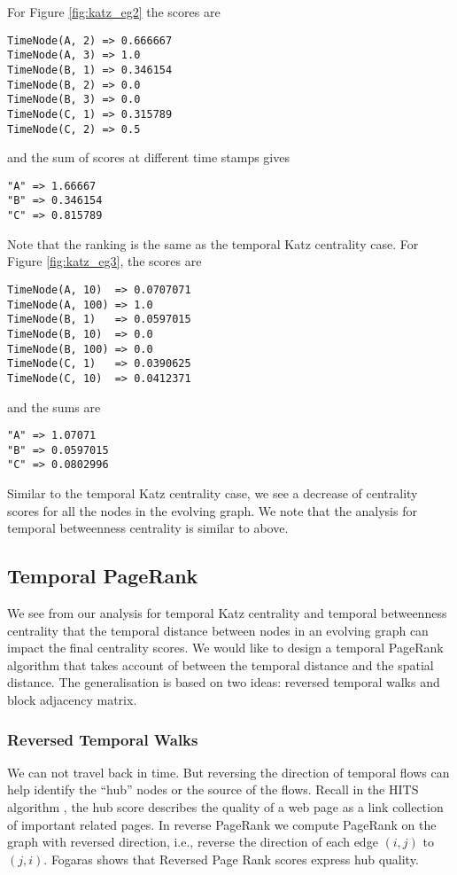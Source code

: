\documentclass[12pt]{article}
\theoremstyle{definition}
\begin{document}
For Figure \ref{fig:katz_eg2} the scores are
\begin{lstlisting}
TimeNode(A, 2) => 0.666667
TimeNode(A, 3) => 1.0
TimeNode(B, 1) => 0.346154
TimeNode(B, 2) => 0.0
TimeNode(B, 3) => 0.0
TimeNode(C, 1) => 0.315789
TimeNode(C, 2) => 0.5
\end{lstlisting}
and the sum of scores at different time stamps gives
\begin{lstlisting}
"A" => 1.66667
"B" => 0.346154
"C" => 0.815789
\end{lstlisting}
Note that the ranking is the same as the temporal Katz centrality case.
For Figure \ref{fig:katz_eg3}, the scores are
\begin{lstlisting}
TimeNode(A, 10)  => 0.0707071
TimeNode(A, 100) => 1.0
TimeNode(B, 1)   => 0.0597015
TimeNode(B, 10)  => 0.0
TimeNode(B, 100) => 0.0
TimeNode(C, 1)   => 0.0390625
TimeNode(C, 10)  => 0.0412371
\end{lstlisting}
and the sums are
\begin{lstlisting}
"A" => 1.07071
"B" => 0.0597015
"C" => 0.0802996
\end{lstlisting}
Similar to the temporal Katz centrality case, we see a decrease of centrality scores
for all the nodes in the evolving graph.
We note that the analysis for temporal betweenness centrality is similar to above.

\subsection{Temporal PageRank}

We see from our analysis for temporal Katz centrality and temporal betweenness centrality
that the temporal distance between nodes in an evolving graph can impact the final centrality scores.
We would like to design a temporal PageRank algorithm that takes account of between
the temporal distance and the spatial distance. The generalisation is based on two ideas:
reversed temporal walks and block adjacency matrix.

\subsubsection{Reversed Temporal Walks}

We can not travel back in time. But reversing the direction of temporal flows can help
identify the ``hub'' nodes or the source of the flows. Recall in the HITS algorithm \cite{kleinberg99},
the hub score describes the quality of a web page as a link collection of important related pages.
In reverse PageRank we compute PageRank on the graph with reversed direction, i.e., reverse the direction of each edge $(i,j)$ to $(j,i)$. Fogaras \cite{fogaras03, gleich15} shows that Reversed Page Rank scores express hub quality.
\end{document}
